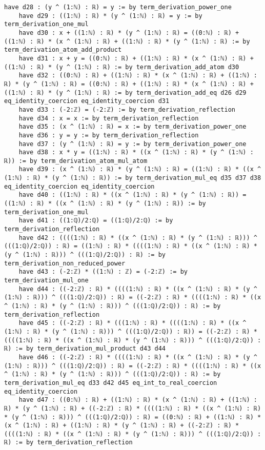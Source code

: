 \documentclass{article}
\begin{document}
\begin{tcolorbox}[colback=white!10, width=\linewidth]
\begin{lstlisting}[language=Lean4]
    have d28 : (y ^ (1:ℕ) : ℝ) = y := by term_derivation_power_one
    have d29 : ((1:ℕ) : ℝ) * (y ^ (1:ℕ) : ℝ) = y := by term_derivation_one_mul
    have d30 : x + ((1:ℕ) : ℝ) * (y ^ (1:ℕ) : ℝ) = ((0:ℕ) : ℝ) + ((1:ℕ) : ℝ) * (x ^ (1:ℕ) : ℝ) + ((1:ℕ) : ℝ) * (y ^ (1:ℕ) : ℝ) := by term_derivation_atom_add_product
    have d31 : x + y = ((0:ℕ) : ℝ) + ((1:ℕ) : ℝ) * (x ^ (1:ℕ) : ℝ) + ((1:ℕ) : ℝ) * (y ^ (1:ℕ) : ℝ) := by term_derivation_add_atom d30
    have d32 : ((0:ℕ) : ℝ) + ((1:ℕ) : ℝ) * (x ^ (1:ℕ) : ℝ) + ((1:ℕ) : ℝ) * (y ^ (1:ℕ) : ℝ) = ((0:ℕ) : ℝ) + ((1:ℕ) : ℝ) * (x ^ (1:ℕ) : ℝ) + ((1:ℕ) : ℝ) * (y ^ (1:ℕ) : ℝ) := by term_derivation_add_eq d26 d29 eq_identity_coercion eq_identity_coercion d31
    have d33 : (-2:ℤ) = (-2:ℤ) := by term_derivation_reflection
    have d34 : x = x := by term_derivation_reflection
    have d35 : (x ^ (1:ℕ) : ℝ) = x := by term_derivation_power_one
    have d36 : y = y := by term_derivation_reflection
    have d37 : (y ^ (1:ℕ) : ℝ) = y := by term_derivation_power_one
    have d38 : x * y = ((1:ℕ) : ℝ) * ((x ^ (1:ℕ) : ℝ) * (y ^ (1:ℕ) : ℝ)) := by term_derivation_atom_mul_atom
    have d39 : (x ^ (1:ℕ) : ℝ) * (y ^ (1:ℕ) : ℝ) = ((1:ℕ) : ℝ) * ((x ^ (1:ℕ) : ℝ) * (y ^ (1:ℕ) : ℝ)) := by term_derivation_mul_eq d35 d37 d38 eq_identity_coercion eq_identity_coercion
    have d40 : ((1:ℕ) : ℝ) * ((x ^ (1:ℕ) : ℝ) * (y ^ (1:ℕ) : ℝ)) = ((1:ℕ) : ℝ) * ((x ^ (1:ℕ) : ℝ) * (y ^ (1:ℕ) : ℝ)) := by term_derivation_one_mul
    have d41 : ((1:ℚ)/2:ℚ) = ((1:ℚ)/2:ℚ) := by term_derivation_reflection
    have d42 : ((((1:ℕ) : ℝ) * ((x ^ (1:ℕ) : ℝ) * (y ^ (1:ℕ) : ℝ))) ^ (((1:ℚ)/2:ℚ)) : ℝ) = ((1:ℕ) : ℝ) * ((((1:ℕ) : ℝ) * ((x ^ (1:ℕ) : ℝ) * (y ^ (1:ℕ) : ℝ))) ^ (((1:ℚ)/2:ℚ)) : ℝ) := by term_derivation_non_reduced_power
    have d43 : (-2:ℤ) * ((1:ℕ) : ℤ) = (-2:ℤ) := by term_derivation_mul_one
    have d44 : ((-2:ℤ) : ℝ) * ((((1:ℕ) : ℝ) * ((x ^ (1:ℕ) : ℝ) * (y ^ (1:ℕ) : ℝ))) ^ (((1:ℚ)/2:ℚ)) : ℝ) = ((-2:ℤ) : ℝ) * ((((1:ℕ) : ℝ) * ((x ^ (1:ℕ) : ℝ) * (y ^ (1:ℕ) : ℝ))) ^ (((1:ℚ)/2:ℚ)) : ℝ) := by term_derivation_reflection
    have d45 : ((-2:ℤ) : ℝ) * (((1:ℕ) : ℝ) * ((((1:ℕ) : ℝ) * ((x ^ (1:ℕ) : ℝ) * (y ^ (1:ℕ) : ℝ))) ^ (((1:ℚ)/2:ℚ)) : ℝ)) = ((-2:ℤ) : ℝ) * ((((1:ℕ) : ℝ) * ((x ^ (1:ℕ) : ℝ) * (y ^ (1:ℕ) : ℝ))) ^ (((1:ℚ)/2:ℚ)) : ℝ) := by term_derivation_mul_product d43 d44
    have d46 : ((-2:ℤ) : ℝ) * ((((1:ℕ) : ℝ) * ((x ^ (1:ℕ) : ℝ) * (y ^ (1:ℕ) : ℝ))) ^ (((1:ℚ)/2:ℚ)) : ℝ) = ((-2:ℤ) : ℝ) * ((((1:ℕ) : ℝ) * ((x ^ (1:ℕ) : ℝ) * (y ^ (1:ℕ) : ℝ))) ^ (((1:ℚ)/2:ℚ)) : ℝ) := by term_derivation_mul_eq d33 d42 d45 eq_int_to_real_coercion eq_identity_coercion
    have d47 : ((0:ℕ) : ℝ) + ((1:ℕ) : ℝ) * (x ^ (1:ℕ) : ℝ) + ((1:ℕ) : ℝ) * (y ^ (1:ℕ) : ℝ) + ((-2:ℤ) : ℝ) * ((((1:ℕ) : ℝ) * ((x ^ (1:ℕ) : ℝ) * (y ^ (1:ℕ) : ℝ))) ^ (((1:ℚ)/2:ℚ)) : ℝ) = ((0:ℕ) : ℝ) + ((1:ℕ) : ℝ) * (x ^ (1:ℕ) : ℝ) + ((1:ℕ) : ℝ) * (y ^ (1:ℕ) : ℝ) + ((-2:ℤ) : ℝ) * ((((1:ℕ) : ℝ) * ((x ^ (1:ℕ) : ℝ) * (y ^ (1:ℕ) : ℝ))) ^ (((1:ℚ)/2:ℚ)) : ℝ) := by term_derivation_reflection

\end{lstlisting}
\end{tcolorbox}
\end{document}
